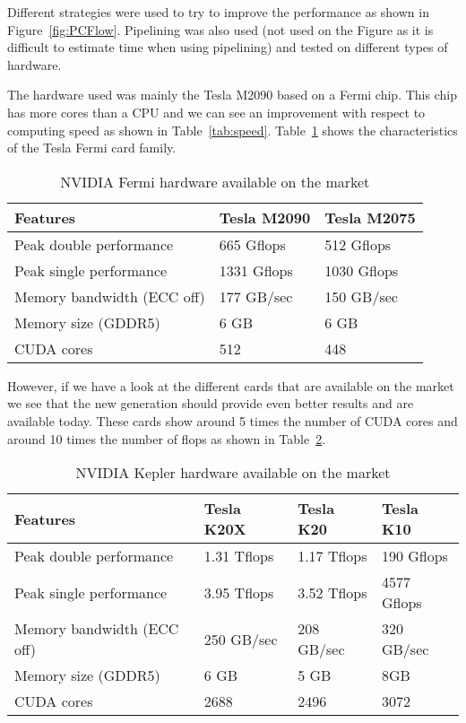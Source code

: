 Different strategies were used to try to improve the performance as shown in Figure~\ref{fig:PCFlow}. Pipelining was also used (not used on the Figure as it is difficult to estimate time when using pipelining) and tested on different types of hardware.

The hardware used was mainly the Tesla M2090 based on a Fermi chip. This chip has more cores than a CPU and we can see an improvement with respect to computing speed as shown in Table~\ref{tab:speed}. Table~\ref{tab:fermi} shows the characteristics of the Tesla Fermi card family.

\begin{table}[H]
\caption{NVIDIA Fermi hardware available on the market}
\label{tab:fermi}
\centering
\begin{tabular}{|l|l|l|}
\hline
Features & Tesla M2090 & Tesla M2075 \\
\hline
\hline
Peak double performance & 665 Gflops  & 512 Gflops \\
\hline
Peak single performance & 1331 Gflops & 1030 Gflops \\
\hline
Memory bandwidth (ECC off) & 177 GB/sec & 150 GB/sec \\
\hline
Memory size (GDDR5) & 6 GB & 6 GB \\
\hline
CUDA cores & 512 & 448 \\
\hline
\end{tabular}
\end{table}

However, if we have a look at the different cards that are available on the market we see that the new generation should provide even better results and are available today. These cards show around 5 times the number of \gls{CUDA} cores and around 10 times the number of \gls{flops} as shown in Table~\ref{tab:kepler}.

\begin{table}[H]
\centering
\caption{NVIDIA Kepler hardware available on the market}
\label{tab:kepler}
\begin{tabular}{|l|l|l|l|}
\hline
Features & Tesla K20X & Tesla K20 & Tesla K10 \\
\hline
\hline
Peak double performance & 1.31 Tflops & 1.17 Tflops & 190 Gflops \\
\hline
Peak single performance & 3.95 Tflops & 3.52 Tflops & 4577 Gflops \\
\hline
Memory bandwidth (ECC off) & 250 GB/sec & 208 GB/sec & 320 GB/sec \\
\hline
Memory size (GDDR5) & 6 GB & 5 GB & 8GB \\
\hline
CUDA cores & 2688 & 2496 & 3072 \\
\hline
\end{tabular}
\end{table}


